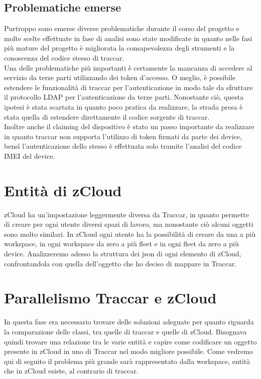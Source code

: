\documentclass[a4paper,titlepage,12pt]{book}
\begin{document}
{\subsection{
Problematiche emerse}
Purtroppo sono emerse diverse problematiche durante il corso del progetto e molte scelte effettuate in fase di analisi sono state modificate in quanto nelle fasi più mature del progetto è migliorata la consapevolezza degli strumenti e la conoscenza del codice stesso di traccar. \\
Una delle problematiche più importanti è certamente la mancanza di accedere al servizio da terze parti utilizzando dei token d'accesso. O meglio, è possibile estendere le funzionalità di traccar per l'autenticazione in modo tale da sfruttare il protocollo LDAP per l'autenticazione da terze parti. Nonostante ciò, questa ipotesi è stata scartata in quanto poco pratica da realizzare, la strada presa è stata quella di estendere direttamente il codice sorgente di traccar.\\
Inoltre anche il claiming del dispositivo è stato un passo importante da realizzare in quanto traccar non supporta l'utilizzo di token firmati da parte dei device, bensì l'autenticazione dello stesso è effettuata solo tramite l'analisi del codice IMEI del device.

\section{
Entità di zCloud}
zCloud ha un'impostazione leggermente diversa da Traccar, in quanto permette di creare per ogni utente diversi spazi di lavoro, ma nonostante ciò alcuni oggetti sono molto similari. In zCloud ogni utente ha la possibilità di creare da una a più workspace, in ogni workspace da zero a più fleet e in ogni fleet da zero a più device. Analizzeremo adesso la struttura dei json di ogni elemento di zCloud, confrontandola con quella dell'oggetto che ho deciso di mappare in Traccar.


\section{
Parallelismo Traccar e zCloud}
In questa fase era necessario trovare delle soluzioni adeguate per quanto riguarda la comparazione delle classi, tra quelle di traccar e quelle di zCloud. Bisognava quindi trovare una relazione tra le varie entità e capire come codificare un oggetto presente in zCloud in uno di Traccar nel modo migliore possibile. Come vedremo qui di seguito il problema più grande sarà rappresentato dalla workspace, entità che in zCloud esiste, al contrario di traccar.



}
\end{document}

